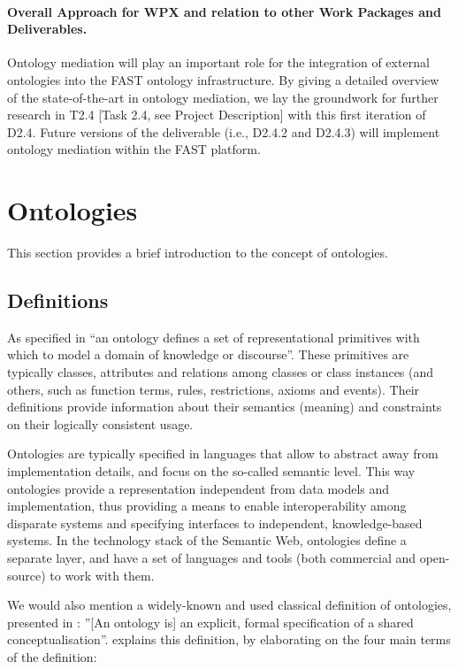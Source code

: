 \documentclass{fast_latex}
\begin{document}
\paragraph{Overall Approach for WPX and relation to other Work Packages and Deliverables.}
Ontology mediation will play an important role for the integration of 
external ontologies into the FAST ontology infrastructure.
By giving a detailed overview of the state-of-the-art in ontology
mediation, we lay the groundwork for further research in T2.4 [Task
2.4, see Project Description] with this first iteration of D2.4. Future
versions of the deliverable (i.e., D2.4.2 and D2.4.3) will implement
ontology mediation within the FAST platform. 

\section{Ontologies}
\label{sec:ontologies}
This section provides a brief introduction to the concept of ontologies.

\subsection{Definitions}
As specified in \cite{gruber2008ontology} {\textquotedblleft}an ontology defines a
set of representational primitives with which to model a domain of
knowledge or discourse{\textquotedblright}. These primitives are
typically classes, attributes and relations among classes or class
instances (and others, such as function terms, rules, restrictions,
axioms and events). Their definitions provide information about their
semantics (meaning) and constraints on their logically consistent
usage. 

Ontologies are typically specified in languages that allow to abstract
away from implementation details, and focus on the so-called semantic
level. This way ontologies provide a representation independent from
data models and implementation, thus providing a means to enable
interoperability among disparate systems and specifying interfaces to
independent, knowledge-based systems. In the technology stack of the
Semantic Web, ontologies define a separate layer, and have a set of
languages and tools (both commercial and open-source) to work with
them. 

We would also mention a widely-known and used classical definition of
ontologies, presented in \cite{gruber93towards}: {\textquotedblright}[An
ontology is] an explicit, formal specification of a shared
conceptualisation{\textquotedblright}. \cite{studer1998knowledge_engineering_principles} explains
this definition, by elaborating on the four main terms of the
definition:
\end{document}
